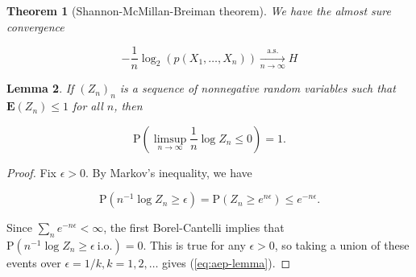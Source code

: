 \documentclass[11pt]{report}
\theoremstyle{plain}
\newtheorem{thm}{Theorem}[chapter]
\newtheorem{lem}[thm]{Lemma}
\theoremstyle{definition}
\begin{document}
\begin{thm}[Shannon-McMillan-Breiman theorem]
\label{thm-shannon-mcmillan-breiman}
We have the almost sure convergence

\begin{equation*} \tag{33}\label{eq:shannon-mcmillan-breiman}
-\frac{1}{n}\log_2(p(X_1,\ldots,X_n)) \xrightarrow[n\to\infty]{\textrm{a.s.}} H
\end{equation*}

\end{thm}

\begin{lem}
\label{lem-aep-lemma}
If $(Z_n)_n$ is a sequence of nonnegative random variables such that $\mathbf{E}(Z_n)\le 1$ for all $n$, then

\begin{equation*} \tag{34}\label{eq:aep-lemma}
\mathrm{P}\left(\limsup_{n\to\infty} \frac{1}{n} \log Z_n \le 0\right) = 1.
\end{equation*}

\end{lem}

\begin{proof}
Fix $\epsilon>0$. By Markov's inequality, we have

\[
\mathrm{P}(n^{-1} \log Z_n \ge \epsilon) = \mathrm{P}(Z_n \ge e^{n\epsilon}) \le e^{-n\epsilon}.
\]

Since $\sum_n e^{-n\epsilon}<\infty$, the first Borel-Cantelli implies that $\mathrm{P}(n^{-1} \log Z_n \ge \epsilon \ \textrm{i.o.}) = 0$. This is true for any $\epsilon>0$, so taking a union of these events over $\epsilon=1/k, k=1,2,\ldots$ gives (\ref{eq:aep-lemma}).
\end{proof}
\end{document}

